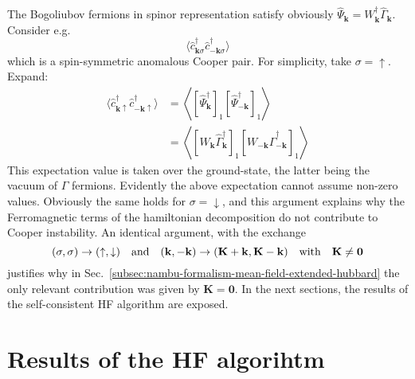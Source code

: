 The Bogoliubov fermions in spinor representation satisfy obviously $\hat \Psi_\mathbf{k} = W_\mathbf{k}^\dagger \hat \Gamma_\mathbf{k}$. Consider e.g.
\[
	\langle
		\hat c_{\mathbf{k}\sigma}^\dagger
		\hat c_{-\mathbf{k}\sigma}^\dagger
	\rangle	
\]
which is a spin-symmetric anomalous Cooper pair. For simplicity, take $\sigma=\uparrow$. Expand:
\[
\begin{aligned}
	\langle
		\hat c_{\mathbf{k}\uparrow}^\dagger
		\hat c_{-\mathbf{k}\uparrow}^\dagger
	\rangle	&= \left\langle 
		[\hat \Psi_\mathbf{k}^\dagger]_1 [\hat \Psi_{-\mathbf{k}}^\dagger]_1 
	\right\rangle \\
	&= \left\langle 
		[W_\mathbf{k} \hat \Gamma_\mathbf{k}^\dagger]_1 [W_{-\mathbf{k}} \hat \Gamma_{-\mathbf{k}}^\dagger]_1 
	\right\rangle
\end{aligned}
\]
This expectation value is taken over the ground-state, the latter being the vacuum of $\Gamma$ fermions. Evidently the above expectation cannot assume non-zero values. Obviously the same holds for $\sigma=\downarrow$, and this argument explains why the Ferromagnetic terms of the hamiltonian decomposition do not contribute to Cooper instability. An identical argument, with the exchange
\[
	(\sigma,\sigma) \to (\uparrow,\downarrow)
	\qq{and}
	(\mathbf{k},-\mathbf{k}) \to (\mathbf{K}+\mathbf{k},\mathbf{K}-\mathbf{k})
	\qq{with}
	\mathbf{K}\neq\mathbf{0}
\]
justifies why in Sec.~\ref{subsec:nambu-formalism-mean-field-extended-hubbard} the only relevant contribution was given by $\mathbf{K}=\mathbf{0}$. In the next sections, the results of the self-consistent HF algorithm are exposed.

\section{Results of the HF algorihtm}\label{sec:mft-solution-hf-results}

\todo